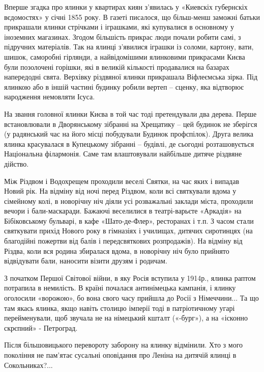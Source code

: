 Вперше згадка про ялинки у квартирах киян з’явилась у «Киевскіх губернскіх
вєдомостях» у січні 1855 року. В газеті писалося, що більш-менш заможні батьки
прикрашали ялинки стрічками і іграшками, які купувалися в основному у іноземних
магазинах. Згодом більшість прикрас люди почали робити самі, з підручних
матеріалів. Так на ялинці з’явилися іграшки із соломи, картону, вати, шишок,
саморобні гірлянди, а найвідомішими ялинковими прикрасами Києва були позолочені
горішки, які в великій кількості продавалися на базарах напередодні свята.
Верхівку різдвяної ялинки прикрашала Віфлеємська зірка. Під ялинкою або в іншій
частині будинку робили вертеп – сценку, яка відтворює народження немовляти
Ісуса.   


На звання головної ялинки Києва в той час тоді претендували два дерева. Перше
встановлювали в Дворянському зібранні на Хрещатику – цей будинок не зберігся
(у радянський час на його місці побудували Будинок профспілок). Друга велика
ялинка красувалася в Купецькому зібранні – будівлі, де сьогодні розташовується
Національна філармонія. Саме там влаштовували найбільше дитяче різдвяне
дійство.


Між Різдвом і Водохрещем проходили веселі Святки, на час яких і випадав Новий
рік. На відміну від ночі перед Різдвом, коли всі святкували вдома у сімейному
колі, в новорічну ніч діяли усі розважальні заклади міста, проходили вечори і
бали-маскаради. Бажаючі веселилися в театрі-варьєте «Аркадія» на Бібіковському
бульварі, в кафе «Шато-де-Флер», ресторанах і т.п. З часом стали святкувати
прихід Нового року в гімназіях і училищах, дитячих сиротинцях (на благодійні
пожертви від балів і передсвяткових розпродажів). На відміну від Різдва, коли
вся родина збиралася вдома, в новорічну ніч було прийнято відвідувати бали,
наносити візити друзям і родичам. 

З початком Першої Світової війни, в яку Росія вступила у 1914р., ялинка раптом
потрапила в немилість. В країні почалася антинімецька кампанія, і ялинку
оголосили «ворожою», бо вона свого часу прийшла до Росії з Німеччини... Та що там
якась ялинка, якщо навіть столицю імперії тоді в патріотичному угарі
перейменували, щоб звучала не на німецький кшталт («-бург»), а на «ісконно
скрєпний» - Петроград.

Після більшовицького перевороту заборону на ялинку відмінили. Хто з мого
покоління не пам’ятає сусальні оповідання про Леніна на дитячій ялинці в
Сокольниках?...

